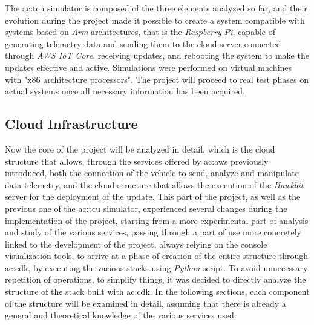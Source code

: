 The \gls{ac:tcu} simulator is composed of the three elements analyzed so far, and their evolution during the project made it possible to create a system compatible with systems based on \textit{Arm} architectures, that is the \textit{Raspberry Pi}, capable of generating telemetry data and sending them to the cloud server connected through \textit{AWS IoT Core}, receiving updates, and rebooting the system to make the updates effective and active. Simulations were performed on virtual machines with "x86 architecture processors". The project will proceed to real test phases on actual systems once all necessary information has been acquired.

\subsection{Cloud Infrastructure}
Now the core of the project will be analyzed in detail, which is the cloud structure that allows, through the services offered by \gls{ac:aws} previously introduced, both the connection of the vehicle to send, analyze and manipulate data telemetry, and the cloud structure that allows the execution of the \textit{Hawkbit} server for the deployment of the update. This part of the project, as well as the previous one of the \gls{ac:tcu} simulator, experienced several changes during the implementation of the project, starting from a more experimental part of analysis and study of the various services, passing through a part of use more concretely linked to the development of the project, always relying on the console visualization tools, to arrive at a phase of creation of the entire structure through \gls{ac:cdk}, by executing the various stacks using \textit{Python} script. To avoid unnecessary repetition of operations, to simplify things, it was decided to directly analyze the structure of the stack built with \gls{ac:cdk}. In the following sections, each component of the structure will be examined in detail, assuming that there is already a general and theoretical knowledge of the various services used.

